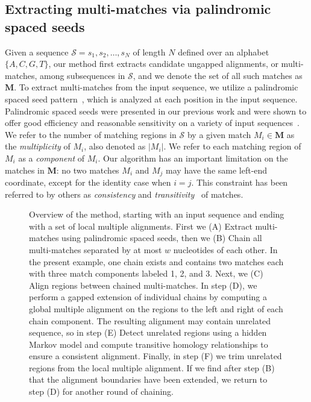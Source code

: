 \documentclass[12pt,journal,letterpaper,onecolumn, draftcls]{IEEEtran}
\begin{document}
\subsection{Extracting multi-matches via palindromic spaced seeds}
Given a sequence $\mathcal{S}=s_1, s_2,\dots, s_N$ of length $N$
defined over an alphabet $\{A,C,G,T\}$, our method first extracts candidate ungapped
alignments, or multi-matches, among subsequences in $\mathcal{S}$,
and we denote the set of all such matches as $\mathbf{M}$. To extract multi-matches from the input
sequence, we utilize a palindromic spaced seed pattern~\cite{ref-zhang}, which is
analyzed at each position in the input sequence.
Palindromic spaced seeds were presented in our previous work and were shown to offer good efficiency and
reasonable sensitivity on a variety of input
sequences~\cite{ref-procrast}.  We refer to the number of matching regions
in $\mathcal{S}$ by a given match $M_i \in \mathbf{M}$ as the
\textit{multiplicity} of $M_i$, also denoted as $|M_i|$. We refer to each
matching region of $M_i$ as a \textit{component} of $M_i$. Our
algorithm has an important limitation on the matches in $\mathbf{M}$:
no two matches $M_i$ and $M_j$ may have the same left-end coordinate,
except for the identity case when $i=j$.  This constraint has been
referred to by others as \textit{consistency} and
\textit{transitivity}~\cite{ref-transitivity} of matches.


\begin{figure}[t!]
\begin{center}
\end{center}
\caption
{Overview of the method, starting with an input sequence and ending
with a set of local multiple alignments. First we (A) Extract
multi-matches using palindromic spaced seeds,
then we (B) Chain all multi-matches separated by at most $w$ nucleotides of each other.  In the present example, one chain exists and
contains two matches each with three match components labeled 1, 2,
and 3.  Next, we (C) Align regions between chained
multi-matches.  In step (D), we perform a gapped extension of individual chains by computing
a global multiple alignment on the regions to the left and right of
each chain component.  The resulting alignment may contain unrelated
sequence, so in step (E) Detect unrelated regions using a hidden Markov model and
compute transitive homology relationships to ensure a consistent
alignment. Finally, in step (F) we trim unrelated regions from the local multiple alignment.
If we find after step (B) that the alignment boundaries have been
extended, we return to step (D) for another round of chaining.}
\label{fig-main}
\end{figure}
\end{document}
